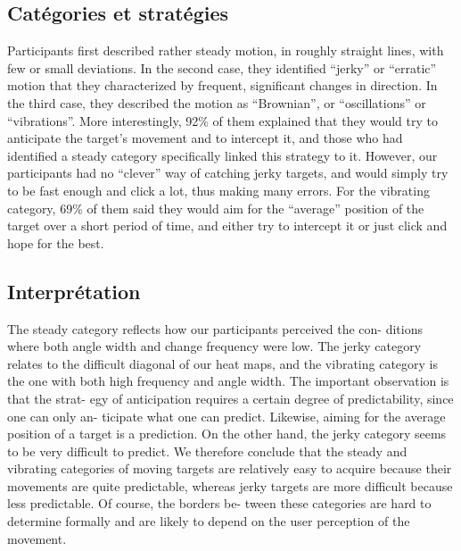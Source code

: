 	\subsection{Catégories et stratégies}
	Participants first described rather steady motion, in roughly straight lines, with few or small deviations. In the second case, they identified “jerky” or “erratic” motion that they characterized by frequent, significant changes in direction. In the third case, they described the motion as “Brownian”, or “oscillations” or “vibrations”. More interestingly, 92\%{} of them explained that they would try to anticipate the target’s movement and to intercept it, and those who had identified a steady category specifically linked this strategy to it. However, our participants had no “clever” way of catching jerky targets, and would simply try to be fast enough and click a lot, thus making many errors. For the vibrating category, 69\%{} of them said
they would aim for the “average” position of the target over a short period of time, and either try to intercept it or just click and hope for the best.

	\subsection{Interprétation}
	The steady category reflects how our participants perceived the con-
ditions where both angle width and change frequency were low. The jerky category
relates to the difficult diagonal of our heat maps, and the vibrating category is the one
with both high frequency and angle width. The important observation is that the strat-
egy of anticipation requires a certain degree of predictability, since one can only an-
ticipate what one can predict. Likewise, aiming for the average position of a target is a
prediction. On the other hand, the jerky category seems to be very difficult to predict.
We therefore conclude that the steady and vibrating categories of moving targets
are relatively easy to acquire because their movements are quite predictable, whereas
jerky targets are more difficult because less predictable. Of course, the borders be-
tween these categories are hard to determine formally and are likely to depend on the
user perception of the movement.

